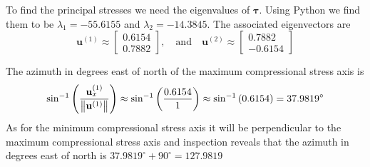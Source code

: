 To find the principal stresses we need the eigenvalues of $\boldsymbol{\tau}$. Using Python we find them to be $\lambda_1 = -55.6155$ and $\lambda_2 = -14.3845$. The associated eigenvectors are 
\begin{equation*}
    \mathbf{u}^{(1)} \approx
    \begin{bmatrix}
        0.6154 \\
        0.7882
    \end{bmatrix}
    , \quad \text{and} \quad
    \mathbf{u}^{(2)} \approx
    \begin{bmatrix}
        0.7882 \\
        -0.6154
    \end{bmatrix}
\end{equation*}

The azimuth in degrees east of north of the maximum compressional stress axis is 
\begin{equation*}
    \sin^{-1}\left( \frac{\mathbf{u}^{(1)}_x}{\left\lVert\mathbf{u}^{(1)}\right\rVert} \right) \approx
    \sin^{-1}\left(\frac{0.6154}{1}\right) \approx 
    \sin^{-1}\left( 0.6154\right) = 37.9819^{\circ}
\end{equation*}
As for the minimum compressional stress axis it will be perpendicular to the maximum compressional stress axis and inspection reveals that the azimuth in degrees east of north is $37.9819^{\circ} + 90^{\circ} = 127.9819$